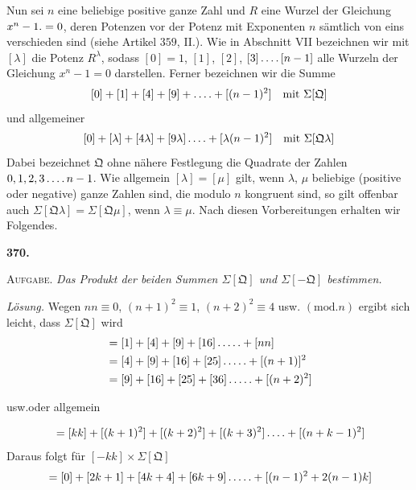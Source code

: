 Nun sei $n$ eine beliebige positive ganze Zahl und $R$ eine Wurzel der Gleichung $x^n-1\mathbin{.}=0$, deren Potenzen vor der Potenz mit Exponenten $n$ sämtlich von eins verschieden sind (siehe Artikel $359$, II.). Wie in Abschnitt VII bezeichnen wir mit $[\lambda]$ die Potenz $R^\lambda$, sodass $[0]=1$, $[1]$, $[2]$, $[3]\mathinner{.\,.\,.\,.}[n-1]$ alle Wurzeln der Gleichung $x^n-1=0$ darstellen. Ferner bezeichnen wir die Summe
\[
{}[0]+[1]+[4]+[9]+\mathinner{.\,.\,.\,.}+[(n-1)^2]\quad\text{mit }\Sigma[\mathfrak{Q}]
\]
und allgemeiner
\[
{}[0]+[\lambda]+[4\lambda]+[9\lambda]\mathinner{.\,.\,.\,.}+[\lambda(n-1)^2]\quad\text{mit }\Sigma[\mathfrak{Q}\lambda]
\]
Dabei bezeichnet $\mathfrak{Q}$ ohne nähere Festlegung die Quadrate der Zahlen $0,1,2,3\mathinner{.\,.\,.\,.} n-1$. Wie allgemein $[\lambda]=[\mu]$ gilt, wenn $\lambda$, $\mu$ beliebige (positive oder negative) ganze Zahlen sind, die modulo $n$ kongruent sind, so gilt offenbar auch $\Sigma[\mathfrak{Q}\lambda]=\Sigma[\mathfrak{Q}\mu]$, wenn $\lambda\equiv\mu$. Nach diesen Vorbereitungen erhalten wir Folgendes.
\par\medskip{}\centerline{\textbf{370.}}\nobreak\smallskip
\textsc{Aufgabe.} \textit{Das Produkt der beiden Summen $\Sigma[\mathfrak{Q}]$ und $\Sigma[-\mathfrak{Q}]$ bestimmen.}
\par\noindent\textit{Lösung.} Wegen $nn\equiv0$, $(n+1)^2\equiv1$, $(n+2)^2\equiv4$ usw. $(\mathrm{mod}.n)$ ergibt sich leicht, dass $\Sigma[\mathfrak{Q}]$ wird
\[
\begin{aligned}
&=[1]+[4]+[9]+[16]\mathinner{.\,.\,.\,.\,.}+[nn]\\
&=[4]+[9]+[16]+[25]\mathinner{.\,.\,.\,.\,.}+[(n+1)]^2\\
&=[9]+[16]+[25]+[36]\mathinner{.\,.\,.\,.\,.}+[(n+2)^2]
\end{aligned}
\]
\centerline{usw.\quad oder allgemein}
\[
{}=[kk]+[(k+1)^2]+[(k+2)^2]+[(k+3)^2]\mathinner{.\,.\,.\,.}+[(n+k-1)^2]
\]
Daraus folgt für $[-kk]\times\Sigma[\mathfrak{Q}]$
\[
{}=[0]+[2k+1]+[4k+4]+[6k+9]\mathinner{.\,.\,.\,.\,.}+[(n-1)^2+2(n-1)k]
\]
